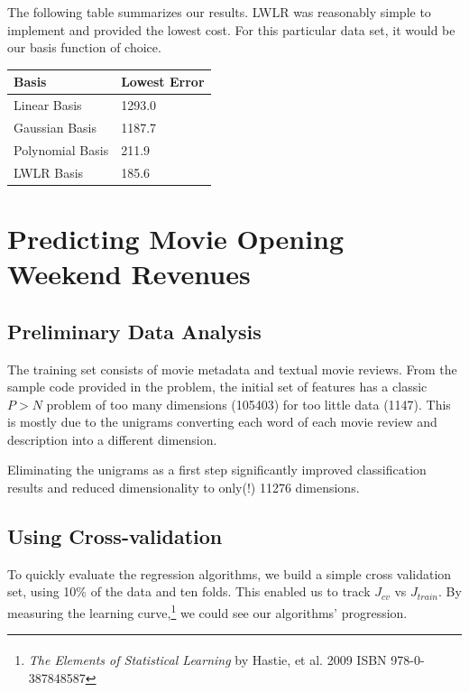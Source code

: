 \documentclass[11pt, oneside]{article}   	%
\begin{document}
The following table summarizes our results. LWLR was reasonably simple to implement and provided the lowest cost. For this particular data set, it would be our basis function of choice.

\begin{center}
    \begin{tabular}{| l | l |}
    \hline
    Basis & Lowest Error \\ \hline
    Linear Basis & \hfill 1293.0 \\
    Gaussian Basis & \hfill 1187.7 \\
    Polynomial Basis & \hfill 211.9 \\
    LWLR Basis & \hfill 185.6 \\
    \hline
    \end{tabular}
\end{center}


\section*{Predicting Movie Opening Weekend Revenues}


\subsection*{Preliminary Data Analysis}

The training set consists of movie metadata and textual movie reviews. From the sample code provided in the problem, the initial set of features has a classic $P > N$ problem of too many dimensions (105403) for too little data (1147).  This is mostly due to the unigrams converting each word of each movie review and description into a different dimension.

Eliminating the unigrams as a first step significantly improved classification results and reduced dimensionality to only(!) 11276 dimensions. 
\subsection*{Using Cross-validation}

To quickly evaluate the regression algorithms, we build a simple cross validation set, using 10\% of the data and ten folds. This enabled us to track $J_{cv}$ vs $J_{train}$. By measuring the learning curve,\footnote{\emph{The Elements of Statistical Learning} by Hastie, et al. \textsuperscript{\textcopyright} 2009 ISBN 978-0-387848587} we could see our algorithms' progression.
\end{document}
